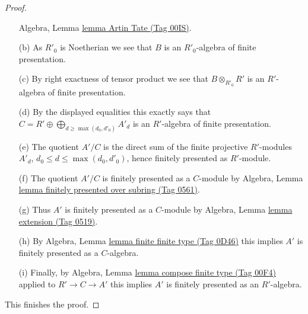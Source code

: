 \documentclass{amsart}
\theoremstyle{plain}
\theoremstyle{definition}
\theoremstyle{remark}
\numberwithin{equation}{subsection}
\begin{document}
\begin{proof}
\begin{enumerate}
Algebra, Lemma \href{https://stacks.math.columbia.edu/tag/00IS}{lemma Artin Tate (Tag 00IS)}.
\item[(b)] As $R'_0$ is Noetherian we see that
$B$ is an $R'_0$-algebra of finite presentation.
\item[(c)] By right exactness of tensor product we see that
$B \otimes_{R'_0} R'$ is an $R'$-algebra of finite presentation.
\item[(d)] By the displayed equalities this exactly says that
$C = R' \oplus \bigoplus_{d \geq \max(d_0, d'_0)} A'_d$
is an $R'$-algebra of finite presentation.
\item[(e)] The quotient $A'/C$ is the direct sum of the finite
projective $R'$-modules $A'_d$, $d_0 \leq d \leq \max(d_0, d'_0)$,
hence finitely presented as $R'$-module.
\item[(f)] The quotient $A'/C$ is finitely presented
as a $C$-module by Algebra, Lemma
\href{https://stacks.math.columbia.edu/tag/0561}{lemma finitely presented over subring (Tag 0561)}.
\item[(g)] Thus $A'$ is finitely presented as a $C$-module by
Algebra, Lemma \href{https://stacks.math.columbia.edu/tag/0519}{lemma extension (Tag 0519)}.
\item[(h)] By Algebra, Lemma \href{https://stacks.math.columbia.edu/tag/0D46}{lemma finite finite type (Tag 0D46)}
this implies $A'$ is finitely presented as a $C$-algebra.
\item[(i)] Finally, by
Algebra, Lemma \href{https://stacks.math.columbia.edu/tag/00F4}{lemma compose finite type (Tag 00F4)}
applied to $R' \to C \to A'$
this implies $A'$ is finitely presented as an $R'$-algebra.
\end{enumerate}
This finishes the proof.
\end{proof}
\end{document}
